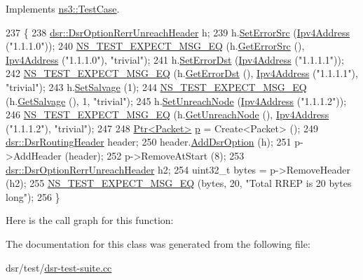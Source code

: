 Implements \hyperlink{classns3_1_1TestCase_a8ff74680cf017ed42011e4be51917a24}{ns3\+::\+Test\+Case}.


\begin{DoxyCode}
237 \{
238   \hyperlink{classns3_1_1dsr_1_1DsrOptionRerrUnreachHeader}{dsr::DsrOptionRerrUnreachHeader} h;
239   h.\hyperlink{classns3_1_1dsr_1_1DsrOptionRerrUnreachHeader_a0d7151da0f101bea94a9c352a7b7174a}{SetErrorSrc} (\hyperlink{classns3_1_1Ipv4Address}{Ipv4Address} (\textcolor{stringliteral}{"1.1.1.0"}));
240   \hyperlink{group__testing_ga7304ba46a28d8cf08dfdfd6499cf7068}{NS\_TEST\_EXPECT\_MSG\_EQ} (h.\hyperlink{classns3_1_1dsr_1_1DsrOptionRerrUnreachHeader_af20fee94c77b871730fae3e29b4a0f4a}{GetErrorSrc} (), 
      \hyperlink{classns3_1_1Ipv4Address}{Ipv4Address} (\textcolor{stringliteral}{"1.1.1.0"}), \textcolor{stringliteral}{"trivial"});
241   h.\hyperlink{classns3_1_1dsr_1_1DsrOptionRerrUnreachHeader_a6d4c996ae8b40494c715ff64261aa317}{SetErrorDst} (\hyperlink{classns3_1_1Ipv4Address}{Ipv4Address} (\textcolor{stringliteral}{"1.1.1.1"}));
242   \hyperlink{group__testing_ga7304ba46a28d8cf08dfdfd6499cf7068}{NS\_TEST\_EXPECT\_MSG\_EQ} (h.\hyperlink{classns3_1_1dsr_1_1DsrOptionRerrUnreachHeader_ad52af57129fd6d28969a2a1f256b5cd5}{GetErrorDst} (), 
      \hyperlink{classns3_1_1Ipv4Address}{Ipv4Address} (\textcolor{stringliteral}{"1.1.1.1"}), \textcolor{stringliteral}{"trivial"});
243   h.\hyperlink{classns3_1_1dsr_1_1DsrOptionRerrUnreachHeader_aa7dd64d6de9c3c474813cbe484e9d773}{SetSalvage} (1);
244   \hyperlink{group__testing_ga7304ba46a28d8cf08dfdfd6499cf7068}{NS\_TEST\_EXPECT\_MSG\_EQ} (h.\hyperlink{classns3_1_1dsr_1_1DsrOptionRerrUnreachHeader_accb89e9b2908de0a0fcd4db3a0ec2246}{GetSalvage} (), 1, \textcolor{stringliteral}{"trivial"});
245   h.\hyperlink{classns3_1_1dsr_1_1DsrOptionRerrUnreachHeader_a6cf82ac792fab829e8a04fb87ec339d4}{SetUnreachNode} (\hyperlink{classns3_1_1Ipv4Address}{Ipv4Address} (\textcolor{stringliteral}{"1.1.1.2"}));
246   \hyperlink{group__testing_ga7304ba46a28d8cf08dfdfd6499cf7068}{NS\_TEST\_EXPECT\_MSG\_EQ} (h.\hyperlink{classns3_1_1dsr_1_1DsrOptionRerrUnreachHeader_a25398f4ae81b699369559c861404e0b9}{GetUnreachNode} (), 
      \hyperlink{classns3_1_1Ipv4Address}{Ipv4Address} (\textcolor{stringliteral}{"1.1.1.2"}), \textcolor{stringliteral}{"trivial"});
247 
248   \hyperlink{classns3_1_1Ptr}{Ptr<Packet>} \hyperlink{lte__link__budget_8m_ac9de518908a968428863f829398a4e62}{p} = Create<Packet> ();
249   \hyperlink{classns3_1_1dsr_1_1DsrRoutingHeader}{dsr::DsrRoutingHeader} header;
250   header.\hyperlink{classns3_1_1dsr_1_1DsrOptionField_acd03d07018e22f5e2b23975fae84fb3c}{AddDsrOption} (h);
251   p->AddHeader (header);
252   p->RemoveAtStart (8);
253   \hyperlink{classns3_1_1dsr_1_1DsrOptionRerrUnreachHeader}{dsr::DsrOptionRerrUnreachHeader} h2;
254   uint32\_t bytes = p->RemoveHeader (h2);
255   \hyperlink{group__testing_ga7304ba46a28d8cf08dfdfd6499cf7068}{NS\_TEST\_EXPECT\_MSG\_EQ} (bytes, 20, \textcolor{stringliteral}{"Total RREP is 20 bytes long"});
256 \}
\end{DoxyCode}


Here is the call graph for this function\+:




The documentation for this class was generated from the following file\+:\begin{DoxyCompactItemize}
\item 
dsr/test/\hyperlink{dsr-test-suite_8cc}{dsr-\/test-\/suite.\+cc}\end{DoxyCompactItemize}
